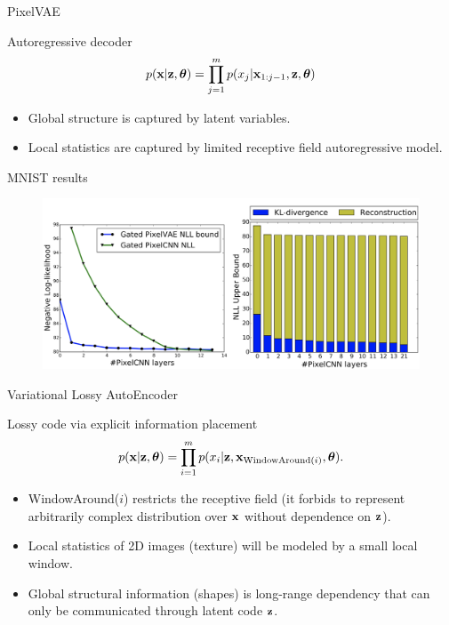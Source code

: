 \begin{frame}{PixelVAE}
	\begin{block}{Autoregressive decoder}
		\vspace{-0.3cm}
		\[
		p(\mathbf{x} | \mathbf{z} , \boldsymbol{\theta}) = \prod_{j=1}^m p(x_j | \mathbf{x}_{1:j - 1}, \mathbf{z} , \boldsymbol{\theta})
		\]
		\vspace{-0.3cm}
	\end{block}
	\begin{itemize}
		\item Global structure is captured by latent variables.
		\item Local statistics are captured by limited receptive field autoregressive model.
	\end{itemize}
	\vspace{-0.1cm}
	\begin{block}{MNIST results}
		\vspace{-0.3cm}
		\begin{figure}
			\centering
			\includegraphics[width=0.75\linewidth]{figs/PixelVAE_2.png}
		\end{figure}
	\end{block}
	
\end{frame}
\begin{frame}{Variational Lossy AutoEncoder}
	\begin{block}{Lossy code via explicit information placement}
		\[
		p(\mathbf{x} | \mathbf{z}, \boldsymbol{\theta}) = \prod_{i=1}^m p(x_i | \mathbf{z}, \mathbf{x}_{\text{WindowAround}(i)}, \boldsymbol{\theta}).
		\]
		\begin{itemize}
			\item WindowAround($i$) restricts the receptive field (it forbids to represent arbitrarily complex distribution over $\mathbf{x}$ without dependence on $\mathbf{z}$). 
			\item Local statistics of 2D images (texture) will be modeled by a small local window.
			\item Global structural information (shapes) is long-range dependency that can only be communicated through latent code $\mathbf{z}$. 
		\end{itemize}
	\end{block}
\end{frame}
